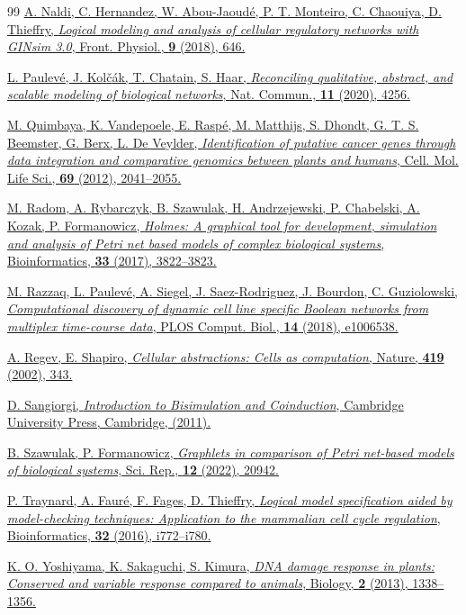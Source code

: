 \begin{thebibliography}{99}
\href{https://doi.org/10.3389/fphys.2018.00646}
{A. Naldi, C. Hernandez, W. Abou-Jaoud\'e, P. T. Monteiro, C. Chaouiya,
D. Thieffry, \textit{Logical modeling and analysis of cellular regulatory
networks with GINsim 3.0}, Front. Physiol., {\bf 9} (2018), 646.}

\href{https://doi.org/10.1038/s41467-020-18112-5}
{L. Paulev\'e, J. Kol{\v{c}}\'ak, T. Chatain, S. Haar, \textit{Reconciling
qualitative, abstract, and scalable modeling of biological networks}, Nat.
Commun., {\bf 11} (2020), 4256.}

\href{https://doi.org/10.1007/s00018-011-0909-x}
{M. Quimbaya, K. Vandepoele, E. Rasp\'e, M. Matthijs, S. Dhondt,
G. T. S. Beemster, G. Berx, L. De Veylder, \textit{Identification of putative
cancer genes through data integration and comparative genomics between plants
and humans}, Cell. Mol. Life Sci., {\bf 69} (2012), 2041--2055.}

\href{https://doi.org/10.1093/bioinformatics/btx492}
{M. Radom, A. Rybarczyk, B. Szawulak, H. Andrzejewski, P. Chabelski, A. Kozak,
P. Formanowicz, \textit{Holmes: A graphical tool for development, simulation
and analysis of Petri net based models of complex biological systems},
Bioinformatics, {\bf 33} (2017), 3822--3823.}

\href{https://doi.org/10.1371/journal.pcbi.1006538}
{M. Razzaq, L. Paulev\'e, A. Siegel, J. Saez-Rodriguez, J. Bourdon,
C. Guziolowski, \textit{Computational discovery of dynamic cell line specific
Boolean networks from multiplex time-course data}, PLOS Comput. Biol., {\bf 14}
(2018), e1006538.}

\href{https://doi.org/10.1038/419343a}
{A. Regev, E. Shapiro, \textit{Cellular abstractions: Cells as computation},
Nature, {\bf 419} (2002), 343.}

\href{https://doi.org/10.1017/CBO9780511777110}
{D. Sangiorgi, \textit{Introduction to Bisimulation and Coinduction}, Cambridge
University Press, Cambridge, (2011).}

\href{https://doi.org/10.1038/s41598-022-24535-5}
{B. Szawulak, P. Formanowicz, \textit{Graphlets in comparison of Petri
net-based models of biological systems}, Sci. Rep., {\bf 12} (2022), 20942.}

\href{https://doi.org/10.1093/bioinformatics/btw457}
{P. Traynard, A. Faur\'e, F. Fages, D. Thieffry, \textit{Logical model
specification aided by model-checking techniques: Application to the mammalian
cell cycle regulation}, Bioinformatics, {\bf 32} (2016), i772--i780.}

\href{https://doi.org/10.3390/biology2041338}
{K. O. Yoshiyama, K. Sakaguchi, S. Kimura, \textit{DNA damage response in
plants: Conserved and variable response compared to animals}, Biology, {\bf 2}
(2013), 1338--1356.}

\end{thebibliography}
